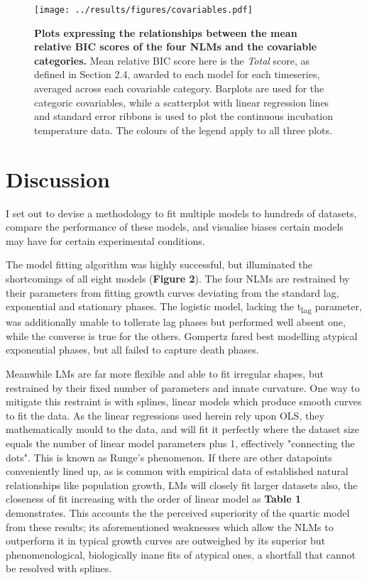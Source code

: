 \documentclass[11pt]{article}
\begin{document}
\begin{figure*}
    \centering
    \texttt{[image: ../results/figures/covariables.pdf]} %
    \caption{\textbf{Plots expressing the relationships between the mean relative BIC scores of the four NLMs and the covariable categories.}  Mean relative BIC score here is the \textit{Total} score, as defined in Section 2.4, awarded to each model for each timeseries, averaged across each covariable category. Barplots are used for the categoric covariables, while a scatterplot with linear regression lines and standard error ribbons is used to plot the continuous incubation temperature data. The colours of the legend apply to all three plots.}
\end{figure*}





\newpage

\section{Discussion}%

I set out to devise a methodology to fit multiple models to hundreds of datasets, compare the performance of these models, and visualise biases certain models may have for certain experimental conditions.

The model fitting algorithm was highly successful, but illuminated the shortcomings of all eight models (\textbf{Figure 2}). The four NLMs are restrained by their parameters from fitting growth curves deviating from the standard lag, exponential and stationary phases. The logistic model, lacking the t\textsubscript{lag} parameter, was additionally unable to tollerate lag phases but performed well absent one, while the converse is true for the others. Gompertz fared best modelling atypical exponential phases, but all failed to capture death phases.

Meanwhile LMs are far more flexible and able to fit irregular shapes, but restrained by their fixed number of parameters and innate curvature. One way to mitigate this restraint is with splines, linear models which produce smooth curves to fit the data.\parencite{White2017} As the linear regressions used herein rely upon OLS, they mathematically mould to the data, and will fit it perfectly where the dataset size equals the number of linear model parameters plus 1, effectively "connecting the dots". This is known as Runge's phenomenon.\parencite{White2017} If there are other datapoints conveniently lined up, as is common with empirical data of established natural relationships like population growth, LMs will closely fit larger datasets also, the closeness of fit increasing with the order of linear model as \textbf{Table 1} demonstrates. This accounts the the perceived superiority of the quartic model from these results; its aforementioned weaknesses which allow the NLMs to outperform it in typical growth curves are outweighed by its superior but phenomenological, biologically inane fits of atypical ones, a shortfall that cannot be resolved with splines.
\end{document}
